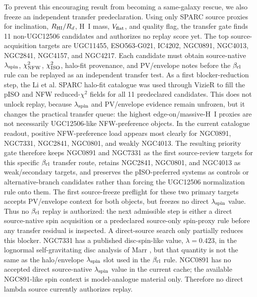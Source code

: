 \documentclass[11pt]{article}
\begin{document}
To prevent this encouraging result from becoming a same-galaxy rescue, we also
freeze an independent transfer predeclaration.  Using only SPARC source proxies
for inclination, \(R_{\rm HI}/R_d\), H~I mass, \(V_{\rm flat}\), and quality
flag, the transfer gate finds 11 non-UGC12506 candidates and authorizes no
replay score yet.  The top source-acquisition targets are UGC11455,
ESO563-G021, IC4202, NGC0891, NGC4013, NGC2841, NGC4157, and NGC4217.  Each
candidate must obtain source-native \(\lambda_{\rm spin}\), \(\chi^2_{\rm NFW}\),
\(\chi^2_{\rm ISO}\), halo-fit provenance, and PV/envelope notes before the
\(\beta_{\rm cl}\) rule can be replayed as an independent transfer test.
As a first blocker-reduction step, the Li et al. SPARC halo-fit catalogue
\cite{Li2020SPARCHaloCatalog} was used through VizieR to fill the pISO and NFW
reduced-\(\chi^2\) fields for all 11 predeclared candidates.  This does not
unlock replay, because \(\lambda_{\rm spin}\) and PV/envelope evidence remain
unfrozen, but it changes the practical transfer queue: the highest
edge-on/massive-H~I proxies are not necessarily UGC12506-like NFW-preference
objects.  In the current catalogue readout, positive NFW-preference load appears
most clearly for NGC0891, NGC7331, NGC2841, NGC0801, and weakly NGC4013.
The resulting priority gate therefore keeps NGC0891 and NGC7331 as the first
source-review targets for this specific \(\beta_{\rm cl}\) transfer route,
retains NGC2841, NGC0801, and NGC4013 as weak/secondary targets, and preserves
the pISO-preferred systems as controls or alternative-branch candidates rather
than forcing the UGC12506 normalization rule onto them.
The first source-freeze preflight for these two primary targets accepts
PV/envelope context for both objects, but freezes no direct
\(\lambda_{\rm spin}\) value.  Thus no \(\beta_{\rm cl}\) replay is authorized:
the next admissible step is either a direct source-native spin acquisition or a
predeclared source-only spin-proxy rule before any transfer residual is
inspected.
A direct-source search only partially reduces this blocker.  NGC7331 has a
published disc-spin-like value, \(\lambda=0.423\), in the lognormal
self-gravitating disc analysis of Marr \cite{Marr2015LognormalDiscAngularMomentum},
but that quantity is not the same as the halo/envelope \(\lambda_{\rm spin}\) slot used in the
\(\beta_{\rm cl}\) rule.  NGC0891 has no accepted direct source-native
\(\lambda_{\rm spin}\) value in the current cache; the available
NGC891-like spin context is model-analogue material only.  Therefore no direct
lambda source currently authorizes replay.
\end{document}
